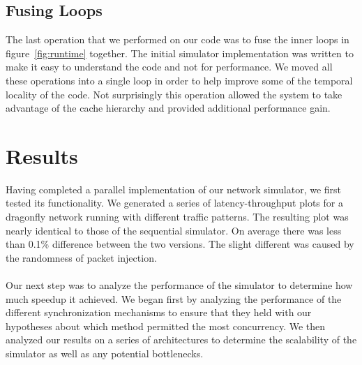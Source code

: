 \documentclass[twocolumn]{article}
\begin{document}
\subsection{Fusing Loops}
The last operation that we performed on our code was to fuse the inner loops in figure~\ref{fig:runtime} together.  The initial simulator implementation was written to make it
easy to understand the code and not for performance.  We moved all these operations into a single loop in order to help improve some of the temporal locality of the
code.  Not surprisingly this operation allowed the system to take
advantage of the cache hierarchy and provided additional performance gain.

\section{Results \label{results}}
Having completed a parallel implementation of our network simulator, we first tested its functionality. We generated a series of latency-throughput plots for a dragonfly network running with different traffic patterns. The resulting plot was nearly identical to those of the sequential simulator. On average there was less than 0.1\% difference between the two versions. The slight different was caused by the randomness of packet injection. \\
~\\
 Our next step was to analyze the performance of the simulator to determine how
much speedup it achieved.  We began first by analyzing the performance of
the different synchronization mechanisms to ensure that they held with our
hypotheses about which method permitted the most concurrency.  We then analyzed
our results on a series of architectures to determine the scalability of
the simulator as well as any potential bottlenecks.
\end{document}
